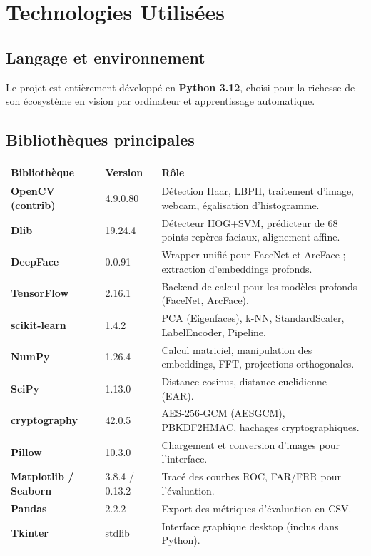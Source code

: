\documentclass[12pt,a4paper]{article}
\begin{document}
\section{Technologies Utilisées}

\subsection{Langage et environnement}

Le projet est entièrement développé en \textbf{Python 3.12}, choisi pour la
richesse de son écosystème en vision par ordinateur et apprentissage automatique.

\subsection{Bibliothèques principales}

\begin{longtable}{>{\bfseries}p{4cm} p{3.5cm} p{6cm}}
\toprule
Bibliothèque & Version & Rôle \\
\midrule
\endhead
\bottomrule
\endfoot
OpenCV (contrib) & 4.9.0.80 & Détection Haar, LBPH, traitement d'image,
                               webcam, égalisation d'histogramme. \\[3pt]
Dlib & 19.24.4 & Détecteur HOG+SVM, prédicteur de 68 points repères faciaux,
                  alignement affine. \\[3pt]
DeepFace & 0.0.91 & Wrapper unifié pour FaceNet et ArcFace ;
                     extraction d'embeddings profonds. \\[3pt]
TensorFlow & 2.16.1 & Backend de calcul pour les modèles profonds
                       (FaceNet, ArcFace). \\[3pt]
scikit-learn & 1.4.2 & PCA (Eigenfaces), k-NN, StandardScaler,
                        LabelEncoder, Pipeline. \\[3pt]
NumPy & 1.26.4 & Calcul matriciel, manipulation des embeddings,
                  FFT, projections orthogonales. \\[3pt]
SciPy & 1.13.0 & Distance cosinus, distance euclidienne (EAR). \\[3pt]
cryptography & 42.0.5 & AES-256-GCM (AESGCM), PBKDF2HMAC, hachages
                         cryptographiques. \\[3pt]
Pillow & 10.3.0 & Chargement et conversion d'images pour l'interface. \\[3pt]
Matplotlib / Seaborn & 3.8.4 / 0.13.2 & Tracé des courbes ROC, FAR/FRR
                                          pour l'évaluation. \\[3pt]
Pandas & 2.2.2 & Export des métriques d'évaluation en CSV. \\[3pt]
Tkinter & stdlib & Interface graphique desktop (inclus dans Python). \\
\end{longtable}
\end{document}
